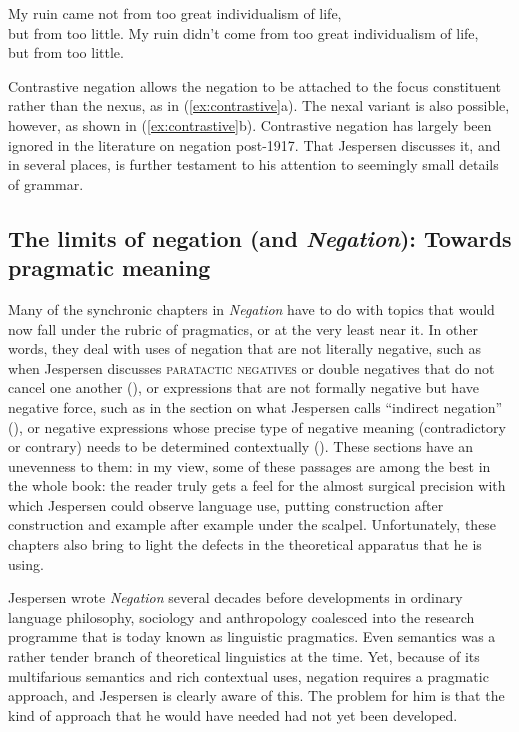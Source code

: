 \documentclass[output=chapter]{langscibook}
\begin{document}
\ea\label{ex:contrastive}
    \ea My ruin came not from too great individualism of life, \\but from too little.
    \ex My ruin didn’t come from too great individualism of life, \\but from too little.
\z\z

Contrastive negation allows the negation to be attached to the focus constituent rather than the nexus, as in (\ref{ex:contrastive}a). The nexal variant is also possible, however, as shown in (\ref{ex:contrastive}b). Contrastive negation has largely been ignored in the literature on negation post-1917. That Jespersen discusses it, and in several places, is further testament to his attention to seemingly small details of grammar.

\subsection{The limits of negation (and \textit{Negation}): Towards pragmatic meaning}

Many of the synchronic chapters in \textit{Negation} have to do with topics that would now fall under the rubric of pragmatics, or at the very least near it. In other words, they deal with uses of negation that are not literally negative, such as when Jespersen discusses \textsc{paratactic negatives} or double negatives that do not cancel one another (), or expressions that are not formally negative but have negative force, such as in the section on what Jespersen calls ``indirect negation'' (), or negative expressions whose precise type of negative meaning (contradictory or contrary) needs to be determined contextually (). These sections have an unevenness to them: in my view, some of these passages are among the best in the whole book: the reader truly gets a feel for the almost surgical precision with which Jespersen could observe language use, putting construction after construction and example after example under the scalpel. Unfortunately, these chapters also bring to light the defects in the theoretical apparatus that he is using.

Jespersen wrote \textit{Negation} several decades before developments in ordinary language philosophy, sociology and anthropology coalesced into the research programme that is today known as linguistic pragmatics. Even semantics was a rather tender branch of theoretical linguistics at the time. Yet, because of its multifarious semantics and rich contextual uses, negation requires a pragmatic approach, and Jespersen is clearly aware of this. The problem for him is that the kind of approach that he would have needed had not yet been developed.
\end{document}
